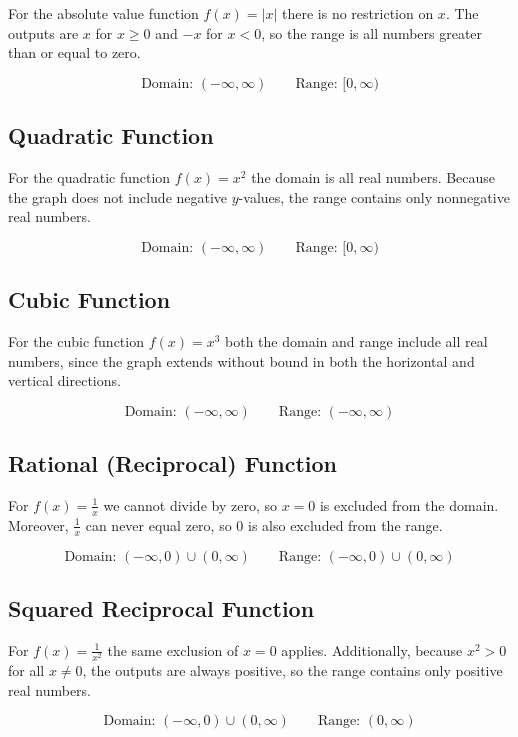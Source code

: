 For the absolute value function $f(x) = |x|$ there is no restriction on $x$.
The outputs are $x$ for $x \geq 0$ and $-x$ for $x < 0$, so the range is all
numbers greater than or equal to zero.

\[
  \text{Domain: }(-\infty, \infty) \qquad \text{Range: }[0, \infty)
\]

\subsection*{Quadratic Function}

For the quadratic function $f(x) = x^{2}$ the domain is all real numbers.
Because the graph does not include negative $y$-values, the range contains
only nonnegative real numbers.

\[
  \text{Domain: }(-\infty, \infty) \qquad \text{Range: }[0, \infty)
\]

\subsection*{Cubic Function}

For the cubic function $f(x) = x^{3}$ both the domain and range include all
real numbers, since the graph extends without bound in both the horizontal and
vertical directions.

\[
  \text{Domain: }(-\infty, \infty) \qquad \text{Range: }(-\infty, \infty)
\]

\subsection*{Rational (Reciprocal) Function}

For $f(x) = \frac{1}{x}$ we cannot divide by zero, so $x = 0$ is excluded
from the domain.  Moreover, $\frac{1}{x}$ can never equal zero, so $0$ is
also excluded from the range.

\[
  \text{Domain: }(-\infty, 0) \cup (0, \infty) \qquad
  \text{Range: }(-\infty, 0) \cup (0, \infty)
\]

\subsection*{Squared Reciprocal Function}

For $f(x) = \frac{1}{x^{2}}$ the same exclusion of $x = 0$ applies.
Additionally, because $x^{2} > 0$ for all $x \neq 0$, the outputs are always
positive, so the range contains only positive real numbers.

\[
  \text{Domain: }(-\infty, 0) \cup (0, \infty) \qquad
  \text{Range: }(0, \infty)
\]

